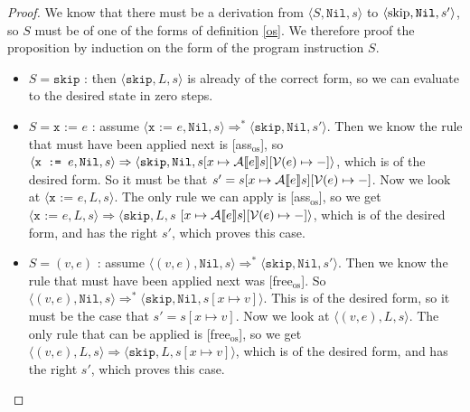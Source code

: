 \begin{proof}
We know that there must be a derivation from $\langle S, \texttt{Nil}, s \rangle$ to $\langle \texttt{\textrm{skip}}, \texttt{Nil}, s' \rangle$, so $S$ must be of one of the forms of definition \ref{os}. We therefore proof the proposition by induction on the form of the program instruction $S$.

\begin{itemize}
    \item $S = \texttt{skip}$ : then $\langle \texttt{skip}, L, s \rangle$ is already of the correct form, so we can evaluate to the desired state in zero steps. 
    
    \item $S = \texttt{x := } e$ : assume $\langle \texttt{x := } e, \texttt{Nil}, s \rangle \Rightarrow ^{*} \langle \texttt{skip}, \texttt{Nil}, s' \rangle$. Then we know the rule that must have been applied next is [ass$_{\textrm{os}}$], so $\langle \texttt{x := } e, \texttt{Nil}, s \rangle \Rightarrow \langle \texttt{skip}, \texttt{Nil}, s[x \mapsto \mathcal{A} \llbracket e \rrbracket s][\mathcal{V}(e)\mapsto-] \rangle$, which is of the desired form. So it must be that $s' = s[x \mapsto \mathcal{A} \llbracket e \rrbracket s][\mathcal{V}(e)\mapsto-]$. Now we look at $\langle \texttt{x := } e, L, s \rangle$. The only rule we can apply is [ass$_{\textrm{os}}$], so we get $\langle \texttt{x := } e, L, s \rangle \Rightarrow \langle \texttt{skip}, L, s$ $[x \mapsto \mathcal{A} \llbracket e \rrbracket s][\mathcal{V}(e)\mapsto-] \rangle$, which is of the desired form, and has the right $s'$, which proves this case. 
    
    \item $S = (v,e)$ : assume $\langle (v,e), \texttt{Nil}, s \rangle \Rightarrow ^{*} \langle \texttt{skip}, \texttt{Nil}, s' \rangle$. Then we know the rule that must have been applied next was [free$_{\textrm{os}}$]. So $\langle (v,e), \texttt{Nil}, s \rangle \Rightarrow ^{*} \langle \texttt{skip}, \texttt{Nil}, s[x\mapsto v] \rangle$. This is of the desired form, so it must be the case that $s' = s[x\mapsto v]$. Now we look at $\langle (v,e), L, s \rangle$. The only rule that can be applied is [free$_{\textrm{os}}$], so we get $\langle (v,e), L, s \rangle \Rightarrow  \langle \texttt{skip}, L, s[x\mapsto v] \rangle$, which is of the desired form, and has the right $s'$, which proves this case.
    

\end{itemize}
\end{proof}
